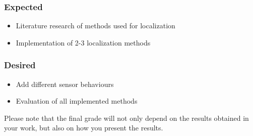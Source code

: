 \documentclass[rnd]{mas_proposal}
\begin{document}
\subsubsection*{Expected}
\begin{itemize}
    \item Literature research of methods used for localization
    \item Implementation of 2-3 localization methods
\end{itemize}

\subsubsection*{Desired}
\begin{itemize}
    \item Add different sensor behaviours
    \item Evaluation of all implemented methods
\end{itemize}

Please note that the final grade will not only depend on the results obtained in your work, but also on how you present the results.

\nocite{*}

\end{document}
